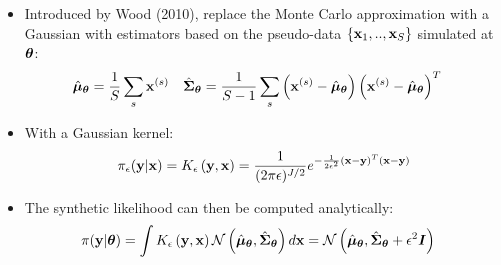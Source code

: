 \documentclass[portrait,a0b,final,a4resizeable]{include/a0poster}
\begin{document}
\begin{poster}
\begin{multicols}{3}
\begin{tabular}{cc}
\end{tabular}


\begin{itemize}
  \item Introduced by Wood (2010), replace the Monte Carlo approximation with a Gaussian with estimators based on the  pseudo-data $\{{\bf x}_1,..,{\bf x}_S\}$ simulated at ${\bm \theta}$:
  \begin{align}
  	\hat{{\bm \mu}}_{{\bm \theta}}    &=  \frac{1}{S} \sum_s {\bf x}^{(s)} & 
  	\hat{{\bm \Sigma}}_{{\bm \theta}} &=  \frac{1}{S-1} \sum_s \left( {\bf x}^{(s)} - \hat{{\bm \mu}}_{{\bm \theta}} \right) \left( {\bf x}^{(s)} - \hat{{\bm \mu}}_{{\bm \theta}} \right)^T \nonumber
  \end{align}
  \item With a Gaussian kernel:
  \begin{equation}
  \pi_{\epsilon}({\bf y}|{\bf x}) = K_{\epsilon}\left( {\bf y}, {\bf x} \right) = \frac{1}{(2\pi\epsilon)^{J/2}} e^{-\frac{1}{2\epsilon^2}\left({\bf x}-{\bf y}\right)^T \left({\bf x}-{\bf y}\right) }\nonumber
  \end{equation}
  \item The synthetic likelihood can then be computed analytically:
  \begin{align}
  	\pi({\bf y}|{\bm \theta}) &= \int K_{\epsilon}\left( {\bf y}, {\bf x} \right) \mathcal{N}\left( \hat{{\bm \mu}}_{{\bm \theta}},\hat{{\bm \Sigma}}_{{\bm \theta}}\right) d{\bf x} \nonumber 
  	= \mathcal{N}\left( \hat{{\bm \mu}}_{{\bm \theta}},\hat{{\bm \Sigma}}_{{\bm \theta}} + \epsilon^2{\bm I} \right) \nonumber
  \end{align}
\end{itemize}


\newpage 
{}



\end{multicols}
\end{poster}
\end{document}
